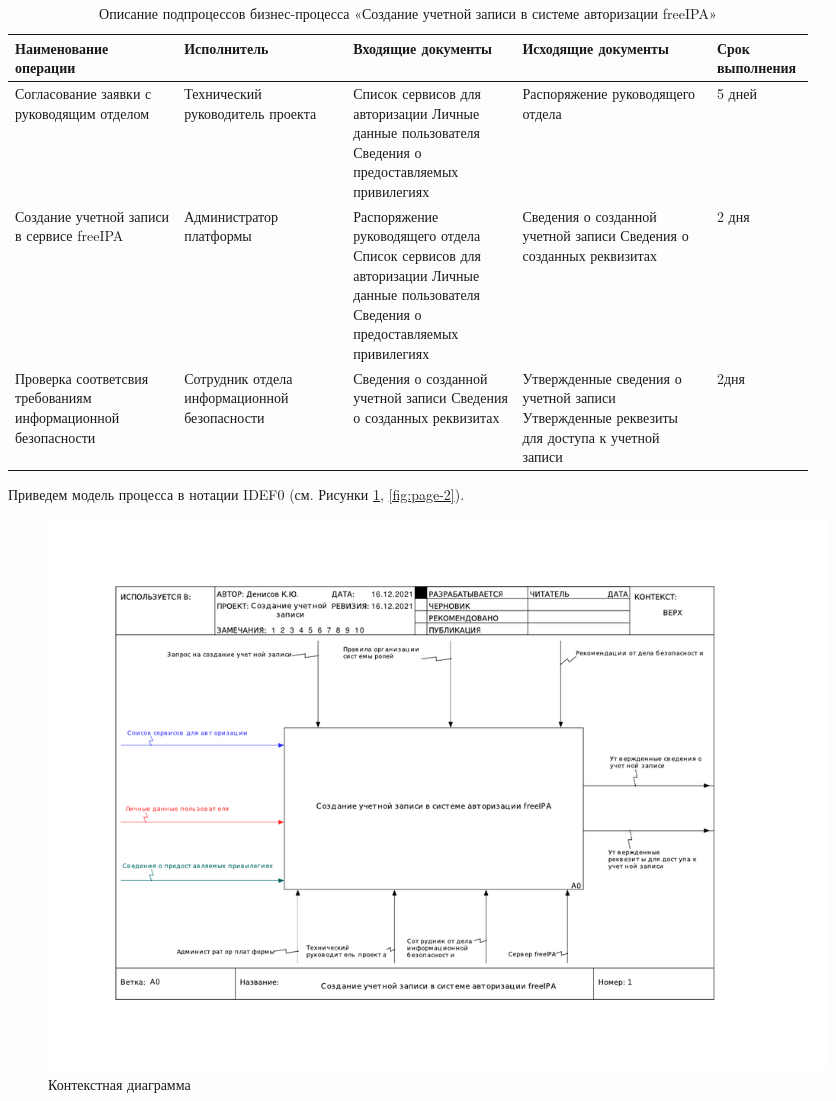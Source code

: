 \documentclass[a4paper,14pt]{extarticle}
\begin{document}
\begin{landscape}

\begin{table}[htbp]
	\caption{Описание подпроцессов бизнес-процесса «Создание учетной записи в системе авторизации freeIPA»}
	\begin{tabular}{|p{0.2\linewidth}|p{0.2\linewidth}|p{0.2\linewidth}|p{0.23\linewidth}|p{0.1\linewidth}|}
		\hline
		\textbf{Наименование операции} & \textbf{Исполнитель} & \textbf{Входящие документы} & \textbf{Исходящие документы} & \textbf{Срок выполнения} \\ \hline
		Согласование заявки с руководящим отделом & Технический руководитель проекта & Список сервисов для авторизации Личные данные пользователя  Сведения о предоставляемых привилегиях & Распоряжение руководящего отдела & 5 дней \\ \hline
		Создание учетной записи в сервисе freeIPA & Администратор платформы & Распоряжение руководящего отдела Список сервисов для авторизации Личные данные пользователя  Сведения о предоставляемых привилегиях & Сведения о созданной учетной записи Сведения о созданных реквизитах & 2 дня \\ \hline
		Проверка соответсвия требованиям информационной безопасности & Сотрудник отдела информационной безопасности & Сведения о созданной учетной записи Сведения о созданных реквизитах & Утвержденные сведения о учетной записи  Утвержденные реквезиты для доступа к учетной записи & 2дня \\ \hline
	\end{tabular}
	\label{tab:freeIPA}
\end{table}

\end{landscape}
\newpage
Приведем модель процесса в нотации IDEF0 (см. Рисунки \ref{fig:page-1}, \ref{fig:page-2}). 

\begin{figure}[h!]
	\centering
	\includegraphics[width=0.9\linewidth]{images/pr-30/page-1}
	\caption{Контекстная диаграмма}
	\label{fig:page-1}
\end{figure}
\end{document}
